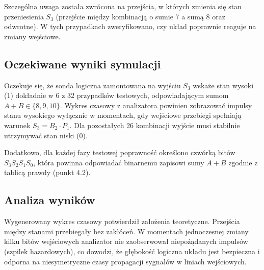 \documentclass[11pt]{article}
\begin{document}
Szczególna uwaga została zwrócona na przejścia, w których zmienia się stan przeniesienia \(S_3\) (przejście między kombinacją o sumie 7 a sumą 8 oraz odwrotne). W tych przypadkach zweryfikowano, czy układ poprawnie reaguje na zmiany wejściowe.

\subsection{Oczekiwane wyniki symulacji}

Oczekuje się, że sonda logiczna zamontowana na wyjściu \(S_3\) wskaże stan wysoki (1) dokładnie w 6 z 32 przypadków testowych, odpowiadającym sumom \(A + B \in \{8, 9, 10\}\). Wykres czasowy z analizatora powinien zobrazować impulsy stanu wysokiego wyłącznie w momentach, gdy wejściowe przebiegi spełniają warunek \(S_3 = B_2 \cdot P_1\). Dla pozostałych 26 kombinacji wyjście musi stabilnie utrzymywać stan niski (0).

Dodatkowo, dla każdej fazy testowej poprawność określono czwórką bitów \(S_3S_2S_1S_0\), która powinna odpowiadać binarnemu zapisowi sumy \(A + B\) zgodnie z tablicą prawdy (punkt 4.2).

\subsection{Analiza wyników}

Wygenerowany wykres czasowy potwierdził założenia teoretyczne. Przejścia między stanami przebiegały bez zakłóceń. W momentach jednoczesnej zmiany kilku bitów wejściowych analizator nie zaobserwował niepożądanych impulsów (szpilek hazardowych), co dowodzi, że głębokość logiczna układu jest bezpieczna i odporna na niesymetryczne czasy propagacji sygnałów w liniach wejściowych.
\end{document}
